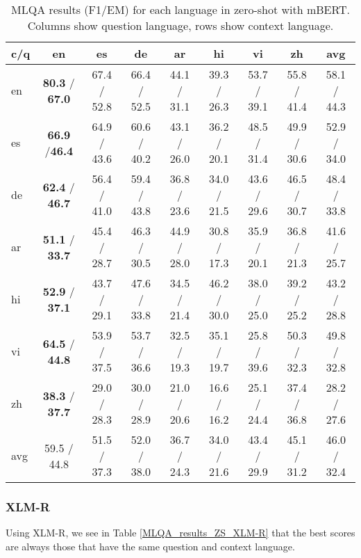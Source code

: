 \documentclass[11pt]{article}
\begin{document}
\begin{table*}[!ht]
    \centering
    \begin{adjustbox}{max width=\textwidth}
    \begin{tabular}{l|ccccccc|c}
    \toprule
        c/q & en & es & de & ar & hi & vi & zh & avg \\ \midrule
        en & \textbf{80.3} / \textbf{67.0} & 67.4 / 52.8 & 66.4 / 52.5 & 44.1 / 31.1 & 39.3 / 26.3 & 53.7 / 39.1 & 55.8 / 41.4 & 58.1 / 44.3 \\
        es & \textbf{66.9} /\textbf{46.4} & 64.9 / 43.6 & 60.6 / 40.2 & 43.1 / 26.0 & 36.2 / 20.1 & 48.5 / 31.4 & 49.9 / 30.6 & 52.9 / 34.0 \\ 
        de & \textbf{62.4} / \textbf{46.7} & 56.4 / 41.0 & 59.4 / 43.8 & 36.8 / 23.6 & 34.0 / 21.5 & 43.6 / 29.6 & 46.5 / 30.7 & 48.4 / 33.8 \\ 
        ar & \textbf{51.1} / \textbf{33.7} & 45.4 / 28.7 & 46.3 / 30.5 & 44.9 / 28.0 & 30.8 / 17.3 & 35.9 / 20.1 & 36.8 / 21.3 & 41.6 / 25.7 \\ 
        hi & \textbf{52.9} / \textbf{37.1} & 43.7 / 29.1 & 47.6 / 33.8 & 34.5 / 21.4 & 46.2 / 30.0 & 38.0 / 25.0 & 39.2 / 25.2 & 43.2 / 28.8 \\ 
        vi & \textbf{64.5} / \textbf{44.8} & 53.9 / 37.5 & 53.7 / 36.6 & 32.5 / 19.3 & 35.1 / 19.7 & 25.8 / 39.6 & 50.3 / 32.3 & 49.8 / 32.8 \\ 
        zh & \textbf{38.3} / \textbf{37.7} & 29.0 / 28.3 & 30.0 / 28.9 & 21.0 / 20.6 & 16.6 / 16.2 & 25.1 / 24.4 & 37.4 / 36.8 & 28.2 / 27.6 \\ \midrule
        avg & 59.5 / 44.8 & 51.5 / 37.3 & 52.0 / 38.0 & 36.7 / 24.3 & 34.0 / 21.6 & 43.4 / 29.9 & 45.1 / 31.2 & 46.0 / 32.4 \\ \bottomrule
    \end{tabular}
    \end{adjustbox}
    \caption{MLQA results (F1/EM) for each language in zero-shot with mBERT. Columns show question language, rows show context language.}
    \label{MLQA_results_ZS_mBERT}
\end{table*}


\subsubsection{XLM-R}

Using XLM-R, we see in Table \ref{MLQA_results_ZS_XLM-R} that the best scores are always those that have the same question and context language. 
\end{document}
